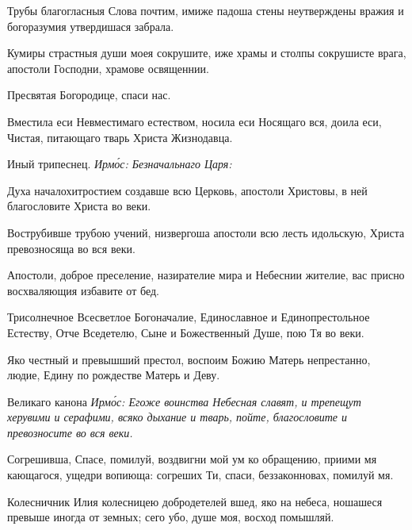 
Трубы благогласныя Слова почтим, имиже падоша стены неутверждены вражия и богоразумия утвердишася забрала.


Кумиры страстныя души моея сокрушите, иже храмы и столпы сокрушисте врага, апостоли Господни, храмове освященнии.

Пресвятая Богородице, спаси нас.

Вместила еси Невместимаго естеством, носила еси Носящаго вся, доила еси, Чистая, питающаго тварь Христа Жизнодавца.

Иный трипеснец. \itshape Ирм\'{о}с\normalfont{}: Безначальнаго Царя:


Духа началохитростием создавше всю Церковь, апостоли Христовы, в ней благословите Христа во веки.


Вострубивше трубою учений, низвергоша апостоли всю лесть идольскую, Христа превозносяща во вся веки.


Апостоли, доброе преселение, назирателие мира и Небеснии жителие, вас присно восхваляющия избавите от бед.


Трисолнечное Всесветлое Богоначалие, Единославное и Единопрестольное Естеству, Отче Вседетелю, Сыне и Божественный Душе, пою Тя во веки.


Яко честный и превышший престол, воспоим Божию Матерь непрестанно, людие, Едину по рождестве Матерь и Деву.

Великаго канона \itshape Ирм\'{о}с\normalfont{}: Егоже воинства Небесная славят, и трепещут херувими и серафими, всяко дыхание и тварь, пойте, благословите и превозносите во вся веки.

Согрешивша, Спасе, помилуй, воздвигни мой ум ко обращению, приими мя кающагося, ущедри вопиюща: согреших Ти, спаси, беззаконновах, помилуй мя.

Колесничник Илия колесницею добродетелей вшед, яко на небеса, ношашеся превыше иногда от земных; сего убо, душе моя, восход помышляй.

